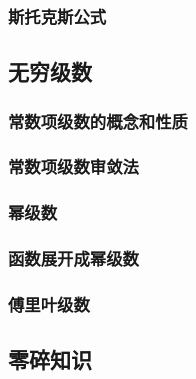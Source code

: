 \documentclass[
]{article}
\begin{document}
\hypertarget{ux65afux6258ux514bux65afux516cux5f0f}{%
\subsubsection{斯托克斯公式}\label{ux65afux6258ux514bux65afux516cux5f0f}}

\hypertarget{ux65e0ux7a77ux7ea7ux6570}{%
\subsection{无穷级数}\label{ux65e0ux7a77ux7ea7ux6570}}

\hypertarget{ux5e38ux6570ux9879ux7ea7ux6570ux7684ux6982ux5ff5ux548cux6027ux8d28}{%
\subsubsection{常数项级数的概念和性质}\label{ux5e38ux6570ux9879ux7ea7ux6570ux7684ux6982ux5ff5ux548cux6027ux8d28}}

\hypertarget{ux5e38ux6570ux9879ux7ea7ux6570ux5ba1ux655bux6cd5}{%
\subsubsection{常数项级数审敛法}\label{ux5e38ux6570ux9879ux7ea7ux6570ux5ba1ux655bux6cd5}}

\hypertarget{ux5e42ux7ea7ux6570}{%
\subsubsection{幂级数}\label{ux5e42ux7ea7ux6570}}

\hypertarget{ux51fdux6570ux5c55ux5f00ux6210ux5e42ux7ea7ux6570}{%
\subsubsection{函数展开成幂级数}\label{ux51fdux6570ux5c55ux5f00ux6210ux5e42ux7ea7ux6570}}

\hypertarget{ux5085ux91ccux53f6ux7ea7ux6570}{%
\subsubsection{傅里叶级数}\label{ux5085ux91ccux53f6ux7ea7ux6570}}

\hypertarget{ux96f6ux788eux77e5ux8bc6}{%
\subsection{零碎知识}\label{ux96f6ux788eux77e5ux8bc6}}
\end{document}
